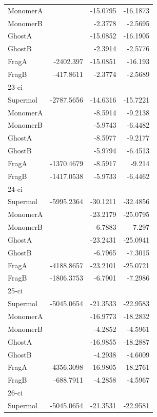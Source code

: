 \documentclass[journal=jctcce,manuscript=article]{achemso}
\begin{document}
\begin{spacing}{1}
\begin{longtable}{lRRR}
    MonomerA &       & -15.0795 & -16.1873 \\
    MonomerB &       & -2.3778 & -2.5695 \\
    GhostA &       & -15.0852 & -16.1905 \\
    GhostB &       & -2.3914 & -2.5776 \\
    FragA & -2402.397 & -15.0851 & -16.193 \\
    FragB & -417.8611 & -2.3774 & -2.5689 \\
    23-ci &       &       &  \\
    Supermol & -2787.5656 & -14.6316 & -15.7221 \\
    MonomerA &       & -8.5914 & -9.2138 \\
    MonomerB &       & -5.9743 & -6.4482 \\
    GhostA &       & -8.5977 & -9.2177 \\
    GhostB &       & -5.9794 & -6.4513 \\
    FragA & -1370.4679 & -8.5917 & -9.214 \\
    FragB & -1417.0538 & -5.9733 & -6.4462 \\
    24-ci &       &       &  \\
    Supermol & -5995.2364 & -30.1211 & -32.4856 \\
    MonomerA &       & -23.2179 & -25.0795 \\
    MonomerB &       & -6.7883 & -7.297 \\
    GhostA &       & -23.2431 & -25.0941 \\
    GhostB &       & -6.7965 & -7.3015 \\
    FragA & -4188.8657 & -23.2101 & -25.0721 \\
    FragB & -1806.3753 & -6.7901 & -7.2986 \\
    25-ci &       &       &  \\
    Supermol & -5045.0654 & -21.3533 & -22.9583 \\
    MonomerA &       & -16.9773 & -18.2832 \\
    MonomerB &       & -4.2852 & -4.5961 \\
    GhostA &       & -16.9855 & -18.2887 \\
    GhostB &       & -4.2938 & -4.6009 \\
    FragA & -4356.3098 & -16.9805 & -18.2761 \\
    FragB & -688.7911 & -4.2858 & -4.5967 \\
    26-ci &       &       &  \\
    Supermol & -5045.0654 & -21.3531 & -22.9581 \\

\end{longtable}
\end{spacing}
\end{document}
